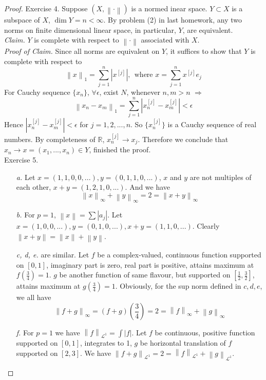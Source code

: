 \documentclass[a4paper, 10pt]{article}
\theoremstyle{definition}
\theoremstyle{hSol}
\begin{document}
\begin{proof} Exercise 4. Suppose $(X, \left\|\cdot\right\|)$ is a normed inear space.
$Y \subset X$ is a subspace of $X$, $\dim Y =n<\infty$. By problem (2) in last homework, any two norms on finite dimensional linear space, in particular, $Y$, are equivalent. \\
\textit{Claim.} $Y$ is complete with respect to $\left\|\cdot\right\|$ associated with $X$. \\
\textit{Proof of Claim.} Since all norms are equivalent on $Y$, it suffices to show that $Y$ is complete with respect to
$$\left\|x\right\|_1 = \sum_{j=1}^n |x^{[j]}|,~~\text{where }x=\sum_{j=1}^n x^{[j]}e_j$$
For Cauchy sequence $\{x_n\}$, $\forall \epsilon$, exist $N$, whenever $n,m>n$ $\Rightarrow$
\begin{equation}
	\left\|x_n-x_m\right\|_1 = \sum_{j=1}^n |x_n^{[j]}-x_m^{[j]}| < \epsilon
\end{equation}
Hence $|x_n^{[j]}-x_m^{[j]}| < \epsilon$ for $j=1,2,...,n$. So $\{x_n^{[j]}\}$ is a Cauchy sequence of real numbers. By completeness of $\mathbb{R}$, $x_n^{[j]}\to x_j$. Therefore we conclude that $x_n \to x=(x_1, ..., x_n) \in Y$, finished the proof.\\
Exercise 5.
\begin{itemize}
	\item[\textit{a.}] Let $x=(1,1,0,0,...), y=(0,1,1,0,...)$, $x$ and $y$ are not multiples of each other, $x+y=(1,2,1,0,...)$. And we have
	$$\left\|x\right\|_{\infty}+\left\|y\right\|_{\infty}=2=\left\|x+y\right\|_{\infty}$$
	\item[\textit{b.}] For $p=1$, $\left\|x\right\|=\sum |a_j|$. Let $x=(1,0,0,...), y=(0,1,0,...), x+y=(1,1,0,...)$. Clearly $\left\|x+y\right\|=\left\|x\right\|+\left\|y\right\|$.
	\item[\textit{c, d, e.}] are similar. Let $f$ be a complex-valued, continuous function supported on $[0,1]$, imaginary part is zero, real part is positive, attains maximum at $f(\frac{3}{4})=1$. $g$ be another function of same flavour, but supported on $[\frac{1}{2}, \frac{3}{2}]$, attains maximum at $g(\frac{3}{4})=1$. Obviously, for the sup norm defined in $c,d,e$, we all have
	$$\left\|f+g\right\|_{\infty} = (f+g)\left(\frac{3}{4}\right) = 2 = \left\|f\right\|_{\infty} + \left\|g\right\|_{\infty}$$
	\item[\textit{f.}] For $p=1$ we have $\left\|f\right\|_{\mathcal{L}^1} = \int |f|$. Let $f$ be continuous, positive function supported on $[0,1]$, integrates to 1, $g$ be horizontal translation of $f$ supported on $[2,3]$. We have $\left\|f+g\right\|_{\mathcal{L}^1}=2=\left\|f\right\|_{\mathcal{L}^1}+\left\|g\right\|_{\mathcal{L}^1}$.
\end{itemize}
\end{proof}
\end{document}
